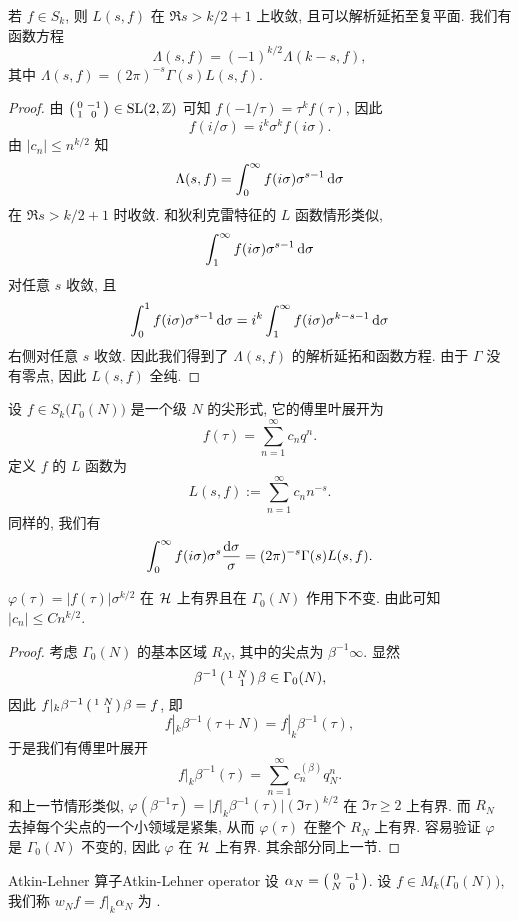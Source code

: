 \begin{theorem}{}{}
若 $f\in S_k$, 则 $L(s,f)$ 在 $\Re s>k/2+1$ 上收敛, 且可以解析延拓至复平面. 我们有函数方程
  \[\Lambda(s,f)=(-1)^{k/2}\Lambda(k-s,f),\]
其中 $\Lambda(s,f)=(2\pi)^{-s}\Gamma(s)L(s,f).$
\end{theorem}
\begin{proof}
由 $\left(\begin{smallmatrix}0 & -1 \\ 1 & 0\end{smallmatrix}\right)\in {\mathrm{SL}}(2,{\mathbb{Z}})$ 可知 $f(-1/\tau)=\tau^kf(\tau)$, 因此
  \[f(i/\sigma)=i^k \sigma^k f(i\sigma).\]
由 $|c_n|\le n^{k/2}$ 知
  \[\Lambda(s,f)=\int_0^\infty f(i\sigma)\sigma^{s-1}\mathop{}\!\mathrm{d} \sigma\]
在 $\Re s>k/2+1$ 时收敛. 和狄利克雷特征的 $L$ 函数情形类似,
  \[\int_1^\infty f(i\sigma)\sigma^{s-1}\mathop{}\!\mathrm{d} \sigma\]
对任意 $s$ 收敛, 且
  \[\int_0^1 f(i\sigma)\sigma^{s-1}\mathop{}\!\mathrm{d} \sigma=i^k\int_1^\infty f(i\sigma)\sigma^{k-s-1}\mathop{}\!\mathrm{d} \sigma\]
右侧对任意 $s$ 收敛. 因此我们得到了 $\Lambda(s,f)$ 的解析延拓和函数方程. 由于 $\Gamma$ 没有零点, 因此 $L(s,f)$ 全纯.
\end{proof}

设 $f\in S_k\bigl(\Gamma_0(N)\bigr)$ 是一个级 $N$ 的尖形式, 它的傅里叶展开为
  \[f(\tau)=\sum_{n=1}^\infty c_nq^n.\]
定义 $f$ 的 $L$ 函数为
  \[L(s,f):=\sum_{n=1}^\infty c_nn^{-s}.\]
同样的, 我们有
  \[\int_0^\infty f(i\sigma)\sigma^s \frac{\mathop{}\!\mathrm{d} \sigma}{\sigma}=(2\pi)^{-s}\Gamma(s)L(s,f).\]

\begin{lemma}{}{}
$\varphi(\tau)=|f(\tau)|\sigma^{k/2}$ 在 ${\mathcal{H}}$ 上有界且在 $\Gamma_0(N)$ 作用下不变. 由此可知 $|c_n|\le Cn^{k/2}$.
\end{lemma}
\begin{proof}
考虑 $\Gamma_0(N)$ 的基本区域 $R_N$, 其中的尖点为 $\beta^{-1}\infty$. 显然
  \[\beta^{-1}\left(\begin{smallmatrix}1 & N \\  & 1\end{smallmatrix}\right)\beta\in \Gamma_0(N),\]
因此 $f|_k \beta^{-1}\left(\begin{smallmatrix}1 & N \\  & 1\end{smallmatrix}\right)\beta=f$, 即
  \[f|_k\beta^{-1}(\tau+N)=f|_k\beta^{-1}(\tau),\]
于是我们有傅里叶展开
  \[f|_k \beta^{-1}(\tau)=\sum_{n=1}^\infty c_n^{(\beta)}q_N^n.\]
和上一节情形类似, $\varphi(\beta^{-1}\tau)=|f|_k\beta^{-1}(\tau)|(\Im \tau)^{k/2}$ 在 $\Im\tau\ge 2$ 上有界. 而 $R_N$ 去掉每个尖点的一个小领域是紧集, 从而 $\varphi(\tau)$ 在整个 $R_N$ 上有界. 容易验证 $\varphi$ 是 $\Gamma_0(N)$ 不变的, 因此 $\varphi$ 在 ${\mathcal{H}}$ 上有界. 其余部分同上一节.
\end{proof}

\begin{definition}{Atkin-Lehner 算子}{Atkin-Lehner operator}
设 $\alpha_N=\left(\begin{smallmatrix}0 & -1 \\ N & 0\end{smallmatrix}\right)$. 设 $f\in M_k\bigl(\Gamma_0(N)\bigr)$, 我们称 $w_Nf=f|_k \alpha_N$ 为 .
\end{definition}

